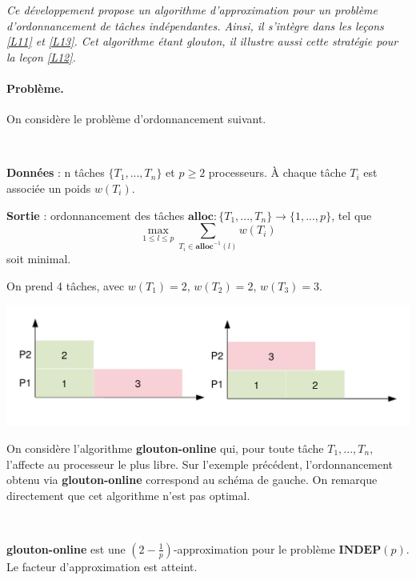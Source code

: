
\textit{
Ce développement propose un algorithme d'approximation pour un problème d'ordonnancement de tâches indépendantes. Ainsi, il s'intègre dans les leçons \ref{L11} et \ref{L13}. 
Cet algorithme étant glouton, il illustre aussi cette stratégie pour la leçon \ref{L12}.
}

\paragraph{Problème.} On considère le problème d’ordonnancement suivant.

\begin{definition}~

\noindent \textbf{Données} : n tâches $\{T_1,...,T_n\}$ et $p\geq 2$ processeurs. À chaque tâche $T_i$ est associée un poids $w(T_i)$.

\noindent \textbf{Sortie} : ordonnancement des tâches $\mathbf{alloc} :  \{T_1,...,T_n\} \rightarrow \{1,...,p\}$, tel que 
$$
\max_{1\leq l \leq p} \sum_{T_i \in \mathbf{alloc}^{-1}(l)}w(T_i)
$$
soit minimal.
\end{definition}


\begin{example} On prend 4 tâches, avec $w(T_1)=2$, $w(T_2)=2$, $w(T_3)=3$.

\begin{center}
\includegraphics[scale=0.6]{Developpements/Approximation ordonnancement/exemple1.pdf} 
\end{center}
\end{example}

On considère l'algorithme \textbf{glouton-online} qui, pour toute tâche $T_1,...,T_n$, l'affecte au processeur le plus libre. Sur l'exemple précédent, l'ordonnancement obtenu via \textbf{glouton-online} correspond au schéma de gauche. On remarque directement que cet algorithme n'est pas optimal.

\begin{theorem}~

\textbf{glouton-online} est une $\left(2-\frac{1}{p}\right)$-approximation pour le problème $\mathbf{INDEP}(p)$. Le facteur d'approximation est atteint.
\end{theorem}


